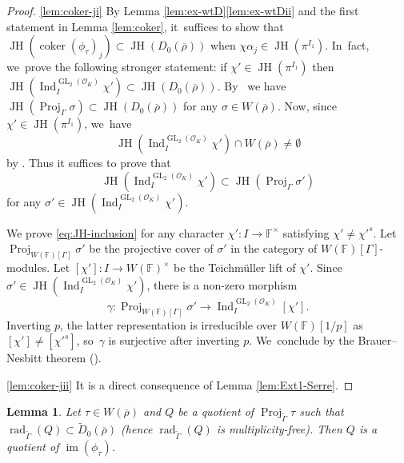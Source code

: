 \documentclass[JEP,XML,SOM,Unicode,NoFloatCountersInSection, NoEqCountersInSection,published]{cedram}
\let\wt\widetilde
\newcommand{\F}{\mathbb{F}}
\newcommand{\cO}{\mathcal{O}}
\newcommand{\brho}{\overline{\rho}}
\DeclareMathOperator{\coker}{coker}
\DeclareMathOperator{\GL}{GL}
\DeclareMathOperator{\im}{im}
\DeclareMathOperator{\Ind}{Ind}
\DeclareMathOperator{\JH}{\mathrm{JH}}
\DeclareMathOperator{\Proj}{Proj}
\DeclareMathOperator{\rad}{rad}
\theoremstyle{plain}
\newtheorem{lem}[prop]{Lemma}
\theoremstyle{definition}
\begin{document}
\begin{proof}
\eqref{lem:coker-ji} By Lemma \ref{lem:ex-wtD}\eqref{lem:ex-wtDii} and the first statement in Lemma \ref{lem:coker}, it~suffices to show that $\JH(\coker(\phi_\tau)_j)\subset \JH(D_0(\brho))$ when $\chi\alpha_j\in \JH(\pi^{I_1})$. In~fact, we~prove the following stronger statement: if $\chi'\in \JH(\pi^{I_1})$ then $\JH(\Ind_I^{\GL_2(\cO_K)}\chi')\subset \JH(D_0(\brho))$. By~\cite[Eq.\,(54)]{BHHMS4} we have $\JH(\Proj_{\Gamma}\sigma)\subset \JH(D_0(\brho))$ for any $\sigma\in W(\brho)$. Now, since $\chi'\in \JH(\pi^{I_1})$, we~have
\[
\JH(\Ind_I^{\GL_2(\cO_K)}\chi')\cap W(\brho)\neq \emptyset
\]
by \cite[Prop.\,4.2]{breuil-buzzati}. Thus it suffices to prove that
\begin{equation}\label{eq:JH-inclusion}\JH(\Ind_I^{\GL_2(\cO_K)}\chi')\subset \JH(\Proj_{\Gamma}\sigma')
\end{equation}
for any $\sigma'\in \JH(\Ind_I^{\GL_2(\cO_K)}\chi')$.

We prove \eqref{eq:JH-inclusion} for any character $\chi':I\to \F^{\times}$ satisfying $\chi'\neq \chi'^s$. Let $\Proj_{W(\F)[\Gamma]}\sigma'$ be the projective cover of $\sigma'$ in the category of $W(\F)[\Gamma]$-modules. Let \hbox{$[\chi']:I\to W(\F)^{\times}$} be the Teichmüller lift of $\chi'$. Since $\sigma'\in \JH(\Ind_I^{\GL_2(\cO_K)}\chi')$, there is a non-zero morphism
\[
\gamma:\Proj_{W(\F)[\Gamma]}\sigma'\to \Ind_I^{\GL_2(\cO_K)}[\chi'].
\]
Inverting $p$, the latter representation is irreducible over $W(\F)[1/p]$ as $[\chi']\neq [\chi'^s]$, so~$\gamma$ is surjective after inverting $p$. We~conclude by the Brauer--Nesbitt theorem {(\cf \cite[Chap.\,15, Th.\,32]{serre-book}).}

\eqref{lem:coker-jii} It is a direct consequence of Lemma \ref{lem:Ext1-Serre}.
\end{proof}

\begin{lem}\label{lem:4.18}
Let $\tau\in W(\brho)$ and $Q$ be a quotient of $\Proj_{\wt{\Gamma}}\tau$ such that $\rad_{\wt\Gamma}(Q)\subset \wt{D}_0(\brho)$ (hence $\rad_{\wt\Gamma}(Q)$ is multiplicity-free). Then $Q$ is a quotient of $\im(\phi_{\tau})$.
\end{lem}
\end{document}

